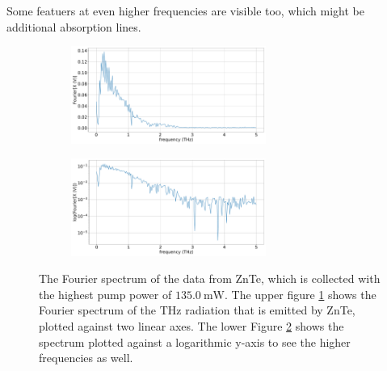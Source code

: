 Some featuers at even higher frequencies are visible too, which might be additional absorption lines.
\begin{figure}%
    \centering
    \begin{subfigure}{\columnwidth}%
        \centering
        \includegraphics[width=0.7\textwidth]{Plots/2_11_30_20normalFX.pdf}%
        \label{fig:2_11_30_20_fft}%
    \end{subfigure}%
    \hfill%
    \begin{subfigure}{\columnwidth}%
        \centering
        \includegraphics[width=0.7\textwidth]{Plots/2_11_30_20normallog(FX).pdf}%
        \label{fig:2_11_30_20_fft_log}%
    \end{subfigure}%
    \caption{The Fourier spectrum of the data from ZnTe, which is collected with the highest pump power of $\SI{135.0}{\milli\W}$.
    The upper figure \ref{fig:2_11_30_20_fft} shows the Fourier spectrum of the $\si{\tera\hertz}$ radiation that is emitted by ZnTe, plotted against two linear axes.
    The lower Figure \ref{fig:2_11_30_20_fft_log} shows the spectrum plotted against a logarithmic y-axis to see the higher frequencies as well.}%
    \label{fig:fourier_znte}%
\end{figure}%
\FloatBarrier
